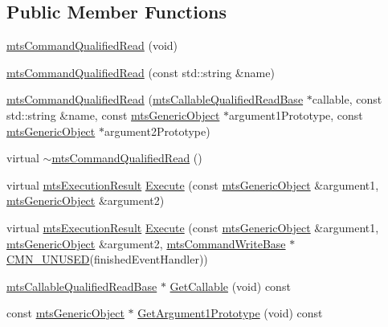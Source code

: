 \subsection*{Public Member Functions}
\begin{DoxyCompactItemize}
\item 
\hyperlink{classmts_command_qualified_read_a8e6ae9f298cbc23e90768ace8842035d}{mts\-Command\-Qualified\-Read} (void)
\item 
\hyperlink{classmts_command_qualified_read_a0a67c7082075e6033ea28aa42aae8620}{mts\-Command\-Qualified\-Read} (const std\-::string \&name)
\item 
\hyperlink{classmts_command_qualified_read_a5e45546521fe7cc27a066a9f739481be}{mts\-Command\-Qualified\-Read} (\hyperlink{classmts_callable_qualified_read_base}{mts\-Callable\-Qualified\-Read\-Base} $\ast$callable, const std\-::string \&name, const \hyperlink{classmts_generic_object}{mts\-Generic\-Object} $\ast$argument1\-Prototype, const \hyperlink{classmts_generic_object}{mts\-Generic\-Object} $\ast$argument2\-Prototype)
\item 
virtual \hyperlink{classmts_command_qualified_read_a10dd4312bf5540ab1d6920b340d19416}{$\sim$mts\-Command\-Qualified\-Read} ()
\item 
virtual \hyperlink{classmts_execution_result}{mts\-Execution\-Result} \hyperlink{classmts_command_qualified_read_a73cccb8b94623c25bcda6b4f34cdfb78}{Execute} (const \hyperlink{classmts_generic_object}{mts\-Generic\-Object} \&argument1, \hyperlink{classmts_generic_object}{mts\-Generic\-Object} \&argument2)
\item 
virtual \hyperlink{classmts_execution_result}{mts\-Execution\-Result} \hyperlink{classmts_command_qualified_read_ae04d6c7d7c4b92a39aeaf4917fa4bead}{Execute} (const \hyperlink{classmts_generic_object}{mts\-Generic\-Object} \&argument1, \hyperlink{classmts_generic_object}{mts\-Generic\-Object} \&argument2, \hyperlink{classmts_command_write_base}{mts\-Command\-Write\-Base} $\ast$\hyperlink{cmn_portability_8h_a021894e2626935fa2305434b1e893ff6}{C\-M\-N\-\_\-\-U\-N\-U\-S\-E\-D}(finished\-Event\-Handler))
\item 
\hyperlink{classmts_callable_qualified_read_base}{mts\-Callable\-Qualified\-Read\-Base} $\ast$ \hyperlink{classmts_command_qualified_read_a6466134df979d8aebe21de71917eb967}{Get\-Callable} (void) const 
\item 
const \hyperlink{classmts_generic_object}{mts\-Generic\-Object} $\ast$ \hyperlink{classmts_command_qualified_read_abe69997dbd70d429668e14861936e179}{Get\-Argument1\-Prototype} (void) const 

\end{DoxyCompactItemize}
